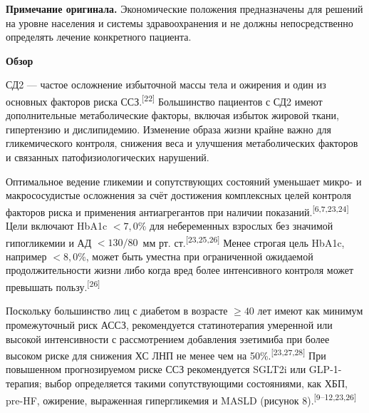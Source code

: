 \documentclass[11pt,a4paper]{article}
\newcommand{\src}[1]{\textsuperscript{[#1]}}
\newcommand{\heading}[1]{\par\medskip\textbf{#1}\par}
\begin{document}
\textbf{Примечание оригинала.} Экономические положения предназначены для решений на уровне населения и системы здравоохранения и не должны непосредственно определять лечение конкретного пациента.

\heading{Обзор}
СД2 --- частое осложнение избыточной массы тела и ожирения и один из основных факторов риска ССЗ.\src{22} Большинство пациентов с СД2 имеют дополнительные метаболические факторы, включая избыток жировой ткани, гипертензию и дислипидемию. Изменение образа жизни крайне важно для гликемического контроля, снижения веса и улучшения метаболических факторов и связанных патофизиологических нарушений.

Оптимальное ведение гликемии и сопутствующих состояний уменьшает микро- и макрососудистые осложнения за счёт достижения комплексных целей контроля факторов риска и применения антиагрегантов при наличии показаний.\src{6,7,23,24} Цели включают HbA1c $<7{,}0\%$ для небеременных взрослых без значимой гипогликемии и АД $<130/80$~мм рт. ст.\src{23,25,26} Менее строгая цель HbA1c, например $<8{,}0\%$, может быть уместна при ограниченной ожидаемой продолжительности жизни либо когда вред более интенсивного контроля может превышать пользу.\src{26}

Поскольку большинство лиц с диабетом в возрасте $\geq40$ лет имеют как минимум промежуточный риск АССЗ, рекомендуется статинотерапия умеренной или высокой интенсивности с рассмотрением добавления эзетимиба при более высоком риске для снижения ХС ЛНП не менее чем на 50\%.\src{23,27,28} При повышенном прогнозируемом риске ССЗ рекомендуется SGLT2i или GLP-1-терапия; выбор определяется такими сопутствующими состояниями, как ХБП, pre-HF, ожирение, выраженная гипергликемия и MASLD (рисунок 8).\src{9--12,23,26}
\end{document}
